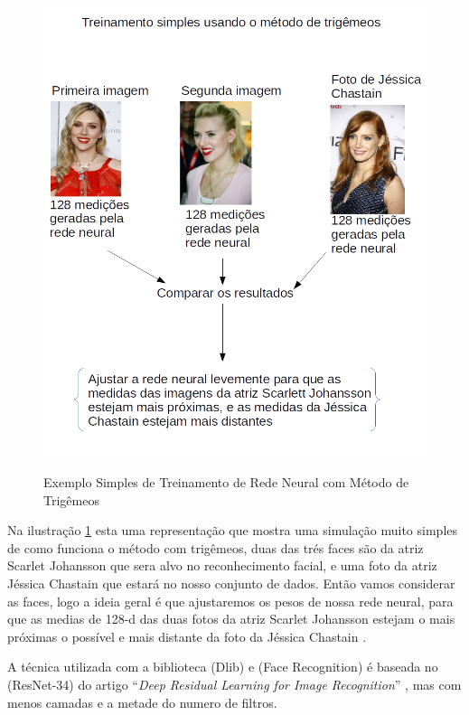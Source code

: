 \begin{figure}[htpb]
  \centering
  \caption{Exemplo Simples de Treinamento de Rede Neural com Método de Trigêmeos}
  \includegraphics[scale=.4]{figs/atrizes.png}
  \label{fig:treinsimp}
\end{figure}

Na ilustração \ref{fig:treinsimp} esta uma representação que mostra uma simulação muito simples de como funciona o método com trigêmeos, duas das trés faces são da atriz Scarlet Johansson que sera alvo no reconhecimento facial, e uma foto da atriz Jéssica Chastain que estará no nosso conjunto de dados. Então vamos considerar as faces, logo a ideia geral é que ajustaremos os pesos de nossa rede neural, para que as medias de 128-d das duas fotos da atriz Scarlet Johansson estejam o mais próximas o possível e mais distante da foto da Jéssica Chastain \cite{adamgeitgey}.

A técnica utilizada com a biblioteca (Dlib) e (Face Recognition) é baseada no (ResNet-34) do artigo “\textit{Deep Residual Learning for Image Recognition}” \cite{DBLP:journals/corr/HeZRS15}, mas com menos camadas e a metade do numero de filtros. 

